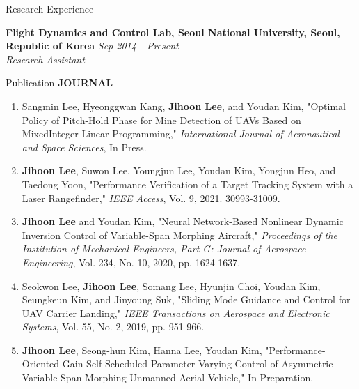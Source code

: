 \documentclass{resume}
\begin{document}
\begin{rSection}{Research Experience}\normalfont

{\bf Flight Dynamics and Control Lab, Seoul National University, Seoul, Republic of Korea} \hfill {\em Sep 2014 - Present} 
\\{\textit{Research Assistant}}

\end{rSection}

\begin{rSection}{Publication}\normalfont
	\textbf{JOURNAL}
	\begin{enumerate}\renewcommand{\labelenumi}{[J\theenumi]}
		\item Sangmin Lee, Hyeonggwan Kang, \textbf{Jihoon Lee}, and Youdan Kim, "Optimal Policy of Pitch-Hold Phase for Mine Detection of UAVs Based on MixedInteger Linear Programming," \textit{International Journal of Aeronautical and Space Sciences}, In Press.
		
		\item \textbf{Jihoon Lee}, Suwon Lee, Youngjun Lee, Youdan Kim, Yongjun Heo, and Taedong Yoon, "Performance Veriﬁcation of a Target Tracking System with a Laser Rangeﬁnder," \textit{IEEE Access}, Vol. 9, 2021. 30993-31009. 
		
		\item \textbf{Jihoon Lee} and Youdan Kim, "Neural Network-Based Nonlinear Dynamic Inversion Control of Variable-Span Morphing Aircraft," \textit{Proceedings of the Institution of Mechanical Engineers, Part G: Journal of Aerospace Engineering}, Vol. 234, No. 10, 2020, pp. 1624-1637. 
		
		\item Seokwon Lee, \textbf{Jihoon Lee}, Somang Lee, Hyunjin Choi, Youdan Kim, Seungkeun Kim, and Jinyoung Suk, "Sliding Mode Guidance and Control for UAV Carrier Landing," \textit{IEEE Transactions on Aerospace and Electronic Systems}, Vol. 55, No. 2, 2019, pp. 951-966. 
		
		\item \color{gray} \textbf{Jihoon Lee}, Seong-hun Kim, Hanna Lee, Youdan Kim, "Performance-Oriented Gain Self-Scheduled Parameter-Varying Control of Asymmetric Variable-Span Morphing Unmanned Aerial Vehicle," In Preparation. \color{black}


\end{enumerate}
\end{rSection}
\end{document}
